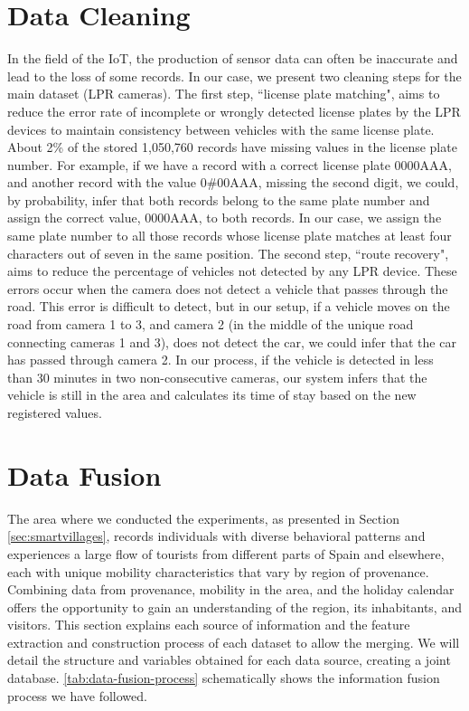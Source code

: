 \section{Data Cleaning} 
\label{sec:DataCleaning}
In the field of the IoT, the production of sensor data can often be inaccurate and lead to the loss of some records. In our case, we present two cleaning steps for the main dataset (LPR cameras). The first step, ``license plate matching", aims to reduce the error rate of incomplete or wrongly detected license plates by the LPR devices to maintain consistency between vehicles with the same license plate. About 2\% of the stored 1,050,760 records have missing values in the license plate number. For example, if we have a record with a correct license plate 0000AAA, and another record with the value 0\#00AAA, missing the second digit, we could, by probability, infer that both records belong to the same plate number and assign the correct value, 0000AAA, to both records. In our case, we assign the same plate number to all those records whose license plate matches at least four characters out of seven in the same position. The second step, ``route recovery", aims to reduce the percentage of vehicles not detected by any LPR device. These errors occur when the camera does not detect a vehicle that passes through the road. This error is difficult to detect, but in our setup, if a vehicle moves on the road from camera 1 to 3, and camera 2 (in the middle of the unique road connecting cameras 1 and 3), does not detect the car, we could infer that the car has passed through camera 2. In our process, if the vehicle is detected in less than 30 minutes in two non-consecutive cameras, our system infers that the vehicle is still in the area and calculates its time of stay based on the new registered values.

\section{Data Fusion} \label{sec:DataFusion}

The area where we conducted the experiments, as presented in Section \ref{sec:smartvillages}, records individuals with diverse behavioral patterns and experiences a large flow of tourists from different parts of Spain and elsewhere, each with unique mobility characteristics that vary by region of provenance. Combining data from provenance, mobility in the area, and the holiday calendar offers the opportunity to gain an understanding of the region, its inhabitants, and visitors. This section explains each source of information and the feature extraction and construction process of each dataset to allow the merging. We will detail the structure and variables obtained for each data source, creating a joint database. \cref{tab:data-fusion-process} schematically shows the information fusion process we have followed.


